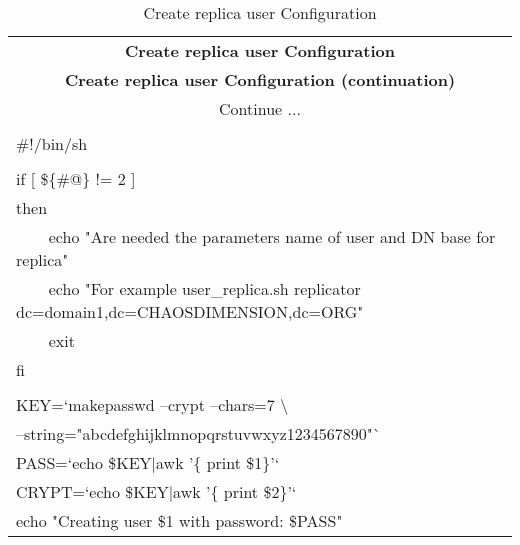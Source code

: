 \begin{center}
\begin{longtable}{|l|}\hline
\caption{Create replica user Configuration}\\
\hline \hline
\multicolumn{1}{|c|}{\textbf{Create replica user Configuration}}\\
\hline \hline
\endfirsthead
\hline \hline
\multicolumn{1}{|c|}{\textbf{Create replica user Configuration (continuation)}}\\
\hline \hline
\endhead
\hline
\multicolumn{1}{|c|}{Continue $\ldots$}\\
\hline
\endfoot
\hline
\multicolumn{1}{|c|}{\textbf{End}}\\
\hline
\endlastfoot
\#!/bin/sh\\
\\
if [ \$\{\#@\} != 2 ]\\
then\\
\verb|    |echo "Are needed the parameters name of user and DN base for replica"\\
\verb|    |echo "For example user\_replica.sh replicator dc=domain1,dc=CHAOSDIMENSION,dc=ORG"\\
\verb|    |exit\\
fi\\
\\
KEY=`makepasswd --crypt --chars=7 \textbackslash\\ --string="abcdefghijklmnopqrstuvwxyz1234567890"`\\
PASS=`echo \$KEY|awk '\{ print \$1\}'`\\
CRYPT=`echo \$KEY|awk '\{ print \$2\}'`\\

echo "Creating user \$1 with password: \$PASS"\\


\end{longtable}
\end{center}
